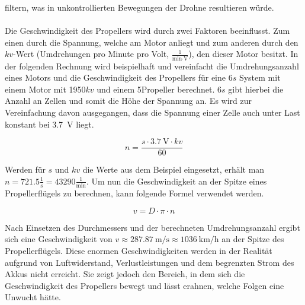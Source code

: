         filtern, was in unkontrollierten Bewegungen der Drohne resultieren würde. \\
        \\
        Die Geschwindigkeit des Propellers wird durch zwei Faktoren beeinflusst. Zum einen durch die Spannung,
        welche am Motor anliegt und zum anderen durch den $kv$-Wert (Umdrehungen pro Minute pro Volt,
        $\frac{1}{\si{\minute}\cdot \si{\volt}}$), den dieser Motor besitzt. In der folgenden Rechnung wird
        beispielhaft und vereinfacht die Umdrehungsanzahl eines Motors und die Geschwindigkeit des Propellers
        für eine 6$s$ System mit einem Motor mit 1950$kv$ und einem 5\dq Propeller berechnet. 6$s$ gibt hierbei
        die Anzahl an Zellen und somit die Höhe der Spannung an. Es wird zur Vereinfachung davon ausgegangen,
        dass die Spannung einer Zelle auch unter Last konstant bei \qty{3,7}{\volt} liegt.
    
        \begin{equation}
            n=\frac{s\cdot\qty{3,7}{\volt}\cdot kv}{60}
        \end{equation}

        Werden für $s$ und $kv$ die Werte aus dem Beispiel eingesetzt, erhält man
        $n=\num{721,5} \frac{1}{\si{\second}} = \num{43290} \frac{1}{\si{\minute}}$. Um nun die Geschwindigkeit
        an der Spitze eines Propellerflügels zu berechnen, kann folgende Formel verwendet werden.
        
        \begin{equation}
            v=D\cdot \pi \cdot n
        \end{equation}

        Nach Einsetzen des Durchmessers und der berechneten Umdrehungsanzahl ergibt sich eine Geschwindigkeit
        von $v\approx \qty{287,87}{\meter\per\second} \approx \qty{1036}{\kilo\meter\per\hour}$ an der Spitze
        des Propellerflügels. Diese enormen Geschwindigkeiten werden in der Realität aufgrund von Luftwiderstand,
        Verlustleistungen und dem begrenzten Strom des Akkus nicht erreicht. Sie zeigt jedoch den Bereich, in dem
        sich die Geschwindigkeit des Propellers bewegt und lässt erahnen, welche Folgen eine Unwucht hätte.